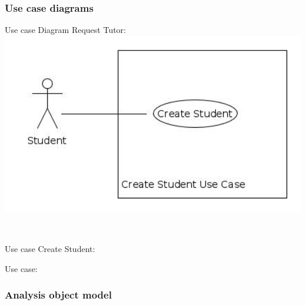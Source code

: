 \documentclass[12pt]{article}
\begin{document}
{		

	\newpage	
\subsubsection{Use case diagrams}
Use case Diagram Request Tutor:
		\centering
		\includegraphics[width=140mm]{./Use_Cases/Create_Student.jpg}
		
\

Use case Create Student:

\newpage
Use case:

		
\newpage
\subsubsection{Analysis object model}
}
\end{document}
